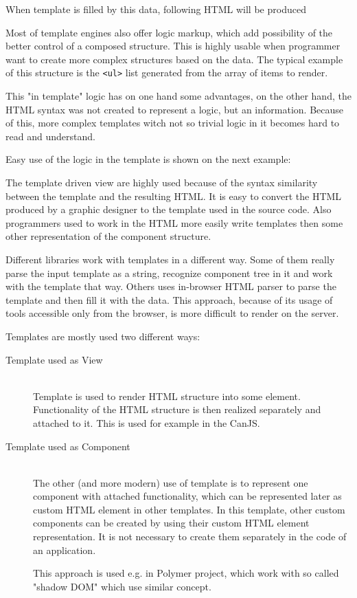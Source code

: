 	When template is filled by this data, following HTML will be produced
  

	Most of template engines also offer logic markup, which add possibility of the better control of a composed structure. 
	This is highly usable when programmer want to create more complex structures based on the data. 
	The typical example of this structure is the \texttt{<ul>} list generated from the array of items to render.
	
	This "in template" logic has on one hand some advantages, on the other hand, 
	the HTML syntax was not created to represent a logic, but an information.
	Because of this, more complex templates witch not so trivial logic in it becomes hard to read and understand.
	
	Easy use of the logic in the template is shown on the next example:
  

	The template driven view are highly used because of the syntax similarity between the template and the resulting HTML. 
	It is easy to convert the HTML produced by a graphic designer to the template used in the source code. 
	Also programmers used to work in the HTML more easily write templates then some other representation of the component structure.

	Different libraries work with templates in a different way. 
	Some of them really parse the input template as a string, recognize component tree in it and work with the template that way.
	Others uses in-browser HTML parser to parse the template and then fill it with the data.
	This approach, because of its usage of tools accessible only from the browser, is more difficult to render on the server.

	Templates are mostly used two different ways:
	\begin{description}
		\item[Template used as View] \hfill \\
			Template is used to render HTML structure into some element. 
			Functionality of the HTML structure is then realized separately and attached to it.  
			This is used for example in the CanJS.
		\item[Template used as Component] \hfill \\
			The other (and more modern) use of template is to represent one component with attached functionality, 
			which can be represented later as custom HTML element in other templates. 
			In this template, other custom components can be created by using their custom HTML element representation. 
			It is not necessary to create them separately in the code of an application.

			This approach is used e.g. in Polymer project, which work with so called "shadow DOM" which use similar concept.
	\end{description}

